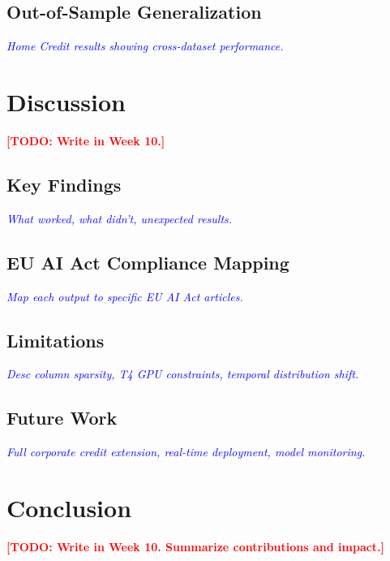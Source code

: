 \documentclass[preprint,12pt]{elsarticle}
\newcommand{\TODO}[1]{\textcolor{red}{\textbf{[TODO: #1]}}}
\newcommand{\PLACEHOLDER}[1]{\textcolor{blue}{\textit{#1}}}
\begin{document}
\subsection{Out-of-Sample Generalization}
\PLACEHOLDER{Home Credit results showing cross-dataset performance.}


\section{Discussion}
\label{sec:discussion}

\TODO{Write in Week 10.}

\subsection{Key Findings}
\PLACEHOLDER{What worked, what didn't, unexpected results.}

\subsection{EU AI Act Compliance Mapping}
\PLACEHOLDER{Map each output to specific EU AI Act articles.}

\subsection{Limitations}
\PLACEHOLDER{Desc column sparsity, T4 GPU constraints, temporal distribution shift.}

\subsection{Future Work}
\PLACEHOLDER{Full corporate credit extension, real-time deployment, model monitoring.}


\section{Conclusion}
\label{sec:conclusion}

\TODO{Write in Week 10. Summarize contributions and impact.}




\end{document}
